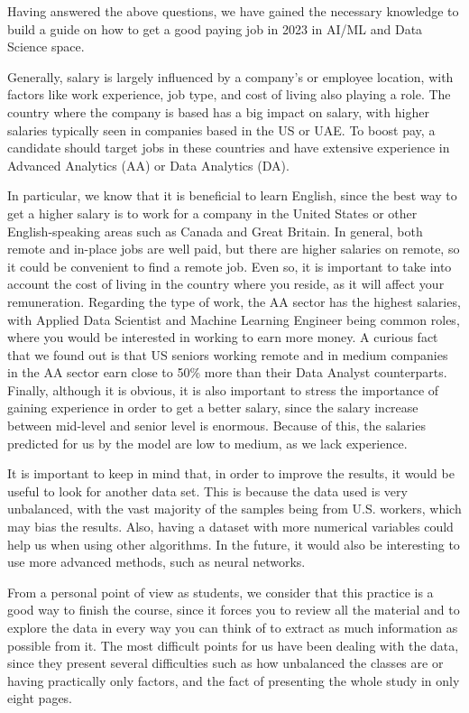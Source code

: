 \documentclass[
]{article}
\begin{document}
Having answered the above questions, we have gained the necessary
knowledge to build a guide on how to get a good paying job in 2023 in
AI/ML and Data Science space.

Generally, salary is largely influenced by a company's or employee
location, with factors like work experience, job type, and cost of
living also playing a role. The country where the company is based has a
big impact on salary, with higher salaries typically seen in companies
based in the US or UAE. To boost pay, a candidate should target jobs in
these countries and have extensive experience in Advanced Analytics (AA)
or Data Analytics (DA).

In particular, we know that it is beneficial to learn English, since the
best way to get a higher salary is to work for a company in the United
States or other English-speaking areas such as Canada and Great Britain.
In general, both remote and in-place jobs are well paid, but there are
higher salaries on remote, so it could be convenient to find a remote
job. Even so, it is important to take into account the cost of living in
the country where you reside, as it will affect your remuneration.
Regarding the type of work, the AA sector has the highest salaries, with
Applied Data Scientist and Machine Learning Engineer being common roles,
where you would be interested in working to earn more money. A curious
fact that we found out is that US seniors working remote and in medium
companies in the AA sector earn close to 50\% more than their Data
Analyst counterparts. Finally, although it is obvious, it is also
important to stress the importance of gaining experience in order to get
a better salary, since the salary increase between mid-level and senior
level is enormous. Because of this, the salaries predicted for us by the
model are low to medium, as we lack experience.

It is important to keep in mind that, in order to improve the results,
it would be useful to look for another data set. This is because the
data used is very unbalanced, with the vast majority of the samples
being from U.S. workers, which may bias the results. Also, having a
dataset with more numerical variables could help us when using other
algorithms. In the future, it would also be interesting to use more
advanced methods, such as neural networks.

From a personal point of view as students, we consider that this
practice is a good way to finish the course, since it forces you to
review all the material and to explore the data in every way you can
think of to extract as much information as possible from it. The most
difficult points for us have been dealing with the data, since they
present several difficulties such as how unbalanced the classes are or
having practically only factors, and the fact of presenting the whole
study in only eight pages.
\end{document}
